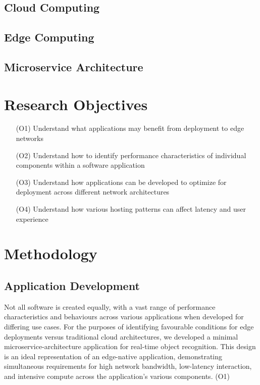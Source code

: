 \documentclass[11pt]{article}
\begin{document}
\subsection{Cloud Computing}
\subsection{Edge Computing}
\subsection{Microservice Architecture}

\newpage
\section{Research Objectives}
\begin{itemize}
    \item [(O1)] {
        Understand what applications may benefit from deployment to edge networks
        }
    \item [(O2)] {
        Understand how to identify performance characteristics of individual components within
        a software application
        }
    \item [(O3)] {
        Understand how applications can be developed to optimize for deployment across different 
        network architectures
        }
    \item [(O4)] {
        Understand how various hosting patterns can affect latency and user experience
        }
\end{itemize}

\newpage
\section{Methodology}
\subsection{Application Development}
Not all software is created equally, with a vast range of performance characteristics and
behaviours across various applications when developed for differing use cases. For the purposes
of identifying favourable conditions for edge deployments versus traditional cloud architectures, 
we developed a minimal microservice-architecture application for real-time object recognition. 
This design is an ideal representation of an edge-native application, demonstrating simultaneous 
requirements for high network bandwidth, low-latency interaction, and intensive compute across 
the application's various components. (O1)\newline
\end{document}
